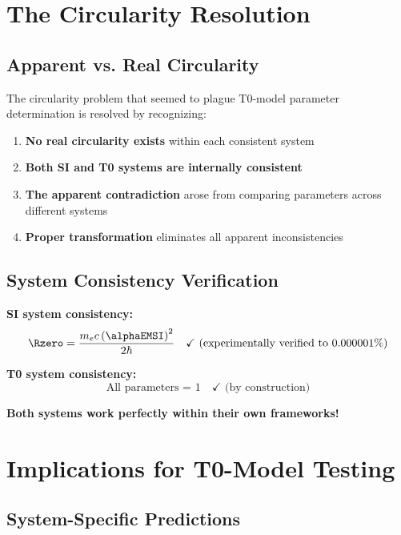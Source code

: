 	\section{The Circularity Resolution}
	\label{sec:circularity_resolution}
	
	\subsection{Apparent vs. Real Circularity}
	\label{subsec:apparent_real_circularity}
	
	The circularity problem that seemed to plague T0-model parameter determination is resolved by recognizing:
	
	\begin{enumerate}
		\item \textbf{No real circularity exists} within each consistent system
		\item \textbf{Both SI and T0 systems are internally consistent}
		\item \textbf{The apparent contradiction} arose from comparing parameters across different systems
		\item \textbf{Proper transformation} eliminates all apparent inconsistencies
	\end{enumerate}
	
	\subsection{System Consistency Verification}
	\label{subsec:system_consistency}
	
	\textbf{SI system consistency:}
	$$\Rzero = \frac{m_e c \left(\alphaEMSI\right)^2}{2\hbar} \quad \checkmark \text{ (experimentally verified to 0.000001\%)}$$
	
	\textbf{T0 system consistency:}
	$$\text{All parameters = 1} \quad \checkmark \text{ (by construction)}$$
	
	\textbf{Both systems work perfectly within their own frameworks!}
	
	\section{Implications for T0-Model Testing}
	\label{sec:testing_implications}
	
	\subsection{System-Specific Predictions}
	\label{subsec:system_specific_predictions}
	
